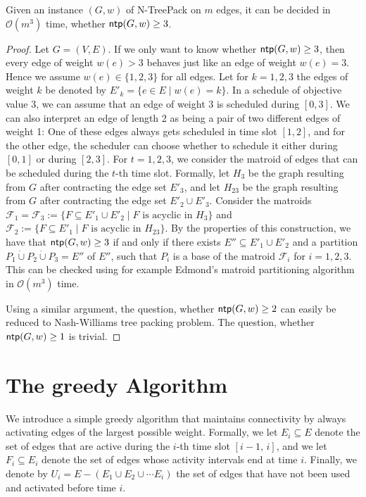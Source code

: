 \documentclass[runningheads]{llncs}
\newcommand{\set}[1]{\{ #1 \}}
\newcommand{\bigO}{\mathcal{O}}
\newcommand{\dotunion}{\mathbin{\dot{\cup}}}
\DeclareMathOperator{\ntp}{\text{\sf ntp}}
\newcommand{\xxxNTP}{{\sc N-TreePack}}
\begin{document}
\begin{theorem}
Given an instance $(G, w)$ of {\xxxNTP} on $m$ edges, it can be decided in $\bigO(m^3)$ time, whether $\ntp(G, w) \geq 3$.
\end{theorem}
\begin{proof}
Let $G = (V, E)$. If we only want to know whether $\ntp(G, w) \geq 3$, then every edge of weight $w(e) > 3$ behaves just like an edge of weight $w(e) = 3$. Hence we assume $w(e) \in \set{1,2,3}$ for all edges. Let for $k = 1,2,3$ the edges of weight $k$ be denoted by $E'_k = \set{e \in E \mid w(e) = k}$. In a schedule of objective value 3, we can assume that an edge of weight 3 is scheduled during $[0, 3]$. We can also interpret an edge of length 2 as being a pair of two different edges of weight 1: One of these edges always gets scheduled in time slot $[1, 2]$, and for the other edge, the scheduler can choose whether to schedule it either during $[0, 1]$ or during $[2, 3]$. For $t = 1,2,3$, we consider the matroid of edges that can be scheduled during the $t$-th time slot. Formally, let $H_3$ be the graph resulting from $G$ after contracting the edge set $E'_3$, and let $H_{23}$ be the graph resulting from $G$ after contracting the edge set $E'_2 \cup E'_3$. Consider the matroids $\mathcal{F}_1 = \mathcal{F}_3 := \set{F \subseteq E'_1 \cup E'_2 \mid F \text{ is acyclic in }H_3}$ and $\mathcal{F}_2 := \set{F \subseteq E'_1 \mid F \text{ is acyclic in }H_{23}}$. By the properties of this construction, we have that $\ntp(G, w) \geq 3$ if and only if there exists $E'' \subseteq E'_1 \cup E'_2$ and a partition $P_1 \dotunion P_2 \dotunion P_3 = E''$ of $E''$, such that $P_i$ is a base of the matroid $\mathcal{F}_i$ for $i=1,2,3$. This can be checked using for example Edmond's matroid partitioning algorithm \cite{edmonds1965minimum} in $\bigO(m^3)$ time.

Using a similar argument, the question, whether $\ntp(G, w) \geq 2$ can easily be reduced to Nash-Williams tree packing problem. The question, whether $\ntp(G, w) \geq 1$ is trivial.
\end{proof}

\section{The greedy Algorithm}
\label{sec:greedy}
We introduce a simple greedy algorithm that maintains connectivity by always
activating edges of the largest possible weight.
Formally, we let $E_i\subseteq E$ denote the set of edges that are active during
the $i$-th time slot $[i-1,\,i]$, and we let $F_i\subseteq E_i$ denote the set of
edges whose activity intervals end at time $i$.
Finally, we denote by $U_i=E-(E_1\cup E_2\cup\cdots E_i)$ the set of edges that
have not been used and activated before time $i$.
\end{document}
